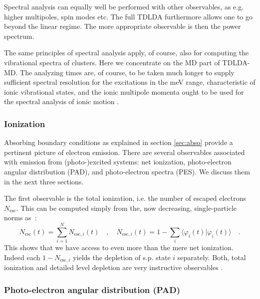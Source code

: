 \documentclass[final,1p]{elsarticle}
\begin{document}
Spectral analysis can equally well be performed with other
observables, as e.g. higher multipoles, spin modes etc. The full
TDLDA furthermore allows one to go beyond the linear regime. The more
appropriate observable is then the power spectrum.


The same principles of spectral analysis apply, of course, also for
computing the vibrational spectra of clusters. Here we concentrate on
the MD part of TDLDA-MD.  The analyzing times are, of course, to be
taken much longer to supply sufficient spectral resolution for the
excitations in the meV range, characteristic of ionic vibrational
states, and the ionic multipole momenta ought to be used for the
spectral analysis of ionic motion \cite{Rei02d}.



\subsubsection{Ionization}
\label{sec:ionization}

Absorbing boundary conditions as explained in section \ref{sec:abso}
provide a pertinent picture of electron emission.  There are several
observables associated with emission from (photo-)excited systems: net
ionization, photo-electron angular distribution (PAD), and
photo-electron spectra (PES). We discuss them in the next three
sections.

The first observable is the total ionization, i.e. the number of
escaped electrons $N_\mathrm{esc}$. This can be computed simply from
the, now decreasing, single-particle norms as~:
\begin{equation}
  N_\mathrm{esc}(t)
  =
  \sum_{i=1}^N N_{\mathrm{esc},i}(t)
  \quad,\quad
  N_{\mathrm{esc},i}(t)
  =
  1-\sum_i \langle \varphi_i(t)|\varphi_i(t)\rangle
  \quad.
\label{eq:nesc}
\end{equation}
This shows that we have access to even more than the mere net
ionization. Indeed each $1-N_{\mathrm{esc},i}$ yields the depletion of
s.p. state $i$ separately. Both, total ionization and detailed level
depletion are very instructive observables \cite{Din12c}.


\subsubsection{Photo-electron angular distribution (PAD)}
\label{sec:pad}
\end{document}
